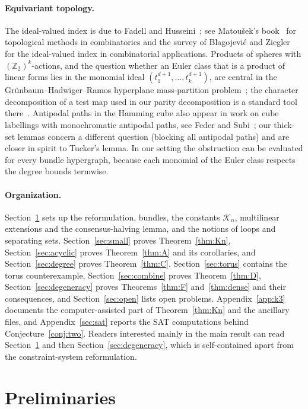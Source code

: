 \documentclass[11pt,letterpaper]{article}
\theoremstyle{definition}
\newcommand{\Z}{\mathbb{Z}}
\begin{document}
\paragraph{Equivariant topology.}
The ideal-valued index is due to Fadell and Husseini~\cite{FH88}; see Matou\v{s}ek's
book~\cite{Mat03} for topological methods in combinatorics and the survey of Blagojevi\'c and
Ziegler~\cite{BZ17} for the ideal-valued index in combinatorial applications. Products of spheres
with $(\Z_2)^k$-actions, and the question whether an Euler class that is a product of linear forms
lies in the monomial ideal $(t_1^{d+1},\dots,t_k^{d+1})$, are central in the Gr\"unbaum--Hadwiger--Ramos
hyperplane mass-partition problem~\cite{Ram96,MVZ06,BFHZ18}; the character decomposition of a test
map used in our parity decomposition is a standard tool there~\cite{BFHZ18}. Antipodal paths in the
Hamming cube also appear in work on cube labellings with monochromatic antipodal paths, see Feder and
Subi~\cite{FS13}; our thick-set lemmas concern a different question (blocking all antipodal paths)
and are closer in spirit to Tucker's lemma. In our setting the obstruction can be
evaluated for every bundle hypergraph, because each monomial of the Euler class respects the
degree bounds termwise.

\paragraph{Organization.}
Section~\ref{sec:prelims} sets up the reformulation, bundles, the constants $\mathcal{K}_n$, multilinear
extensions and the consensus-halving lemma, and the notions of loops and separating sets.
Section~\ref{sec:small} proves Theorem~\ref{thm:Kn}, Section~\ref{sec:acyclic} proves
Theorem~\ref{thm:A} and its corollaries, and Section~\ref{sec:degree} proves Theorem~\ref{thm:C}.
Section~\ref{sec:torus} contains the torus counterexample, Section~\ref{sec:combine} proves
Theorem~\ref{thm:D}, Section~\ref{sec:degeneracy} proves Theorems~\ref{thm:F} and~\ref{thm:dense} and their
consequences, and Section~\ref{sec:open} lists open problems. Appendix~\ref{app:k3} documents the
computer-assisted part of Theorem~\ref{thm:Kn} and the ancillary files, and Appendix~\ref{sec:sat}
reports the SAT computations behind Conjecture~\ref{conj:two}. Readers interested mainly in the main
result can read Section~\ref{sec:prelims} and then Section~\ref{sec:degeneracy}, which is
self-contained apart from the constraint-system reformulation.

\section{Preliminaries}\label{sec:prelims}
\end{document}
